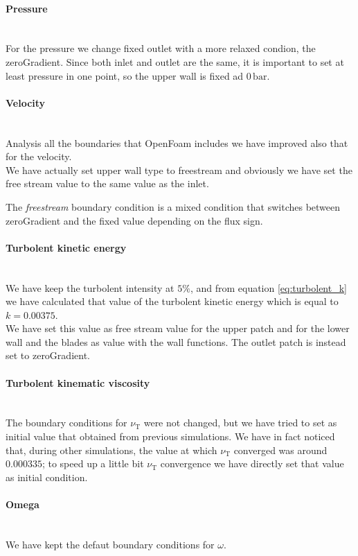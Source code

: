 \documentclass[a4paper,12pt]{article}
\newcommand{\nut}{\nu_\text{T}}
\begin{document}
\paragraph{Pressure} \mbox{}\\
For the pressure we change fixed outlet with a more relaxed condion, the zeroGradient.
Since both inlet and outlet are the same, it is important to set at least pressure in one point, so the upper wall is fixed ad $0\,\text{bar}$.

\paragraph{Velocity} \mbox{}\\
Analysis all the boundaries that OpenFoam includes we have improved also that for the velocity.\\
We have actually set upper wall type to freestream and obviously we have set the free stream value to the same value as the inlet.

The \emph{freestream} boundary condition is a mixed condition that switches between zeroGradient and the fixed value depending on the flux sign.

\paragraph{Turbolent kinetic energy}\mbox{}\\
We have keep the turbolent intensity at $5\%$, and from equation \ref{eq:turbolent_k} we have calculated that value of the turbolent kinetic energy which is equal to $k = 0.00375$.\\
We have set this value as free stream value for the upper patch and for the lower wall and the blades as value with the wall functions.
The outlet patch is instead set to zeroGradient.

\paragraph{Turbolent kinematic viscosity}\mbox{}\\
The boundary conditions for $\nut$ were not changed, but we have tried to set as initial value that obtained from previous simulations. We have in fact noticed that, during other simulations, the value at which $\nut$ converged was around $0.000335$; to speed up a little bit $\nut$ convergence we have directly set that value as initial condition.

\paragraph{Omega}\mbox{}\\
We have kept the defaut boundary conditions for $\omega$.
\end{document}

